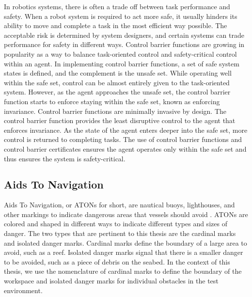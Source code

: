 In robotics systems, there is often a trade off between task performance and safety. When a robot system is required to act more safe, it usually hinders its ability to move and complete a task in the most efficient way possible. The acceptable risk is determined by system designers, and certain systems can trade performance for safety in different ways. Control barrier functions \cite{ames2019control} are growing in popularity as a way to balance task-oriented control and safety-critical control within an agent. In implementing control barrier functions, a set of safe system states is defined, and the complement is the unsafe set. While operating well within the safe set, control can be almost entirely given to the task-oriented system. However, as the agent approaches the unsafe set, the control barrier function starts to enforce staying within the safe set, known as enforcing invariance. Control barrier functions are minimally invasive by design. The control barrier function provides the least disruptive control to the agent that enforces invariance. As the state of the agent enters deeper into the safe set, more control is returned to completing tasks. The use of control barrier functions and control barrier certificates ensures the agent operates only within the safe set and thus ensures the system is safety-critical.

\subsection{Aids To Navigation}

Aids To Navigation, or ATONs for short, are nautical buoys, lighthouses, and other markings to indicate dangerous areas that vessels should avoid \cite{CoastGuard}. ATONs are colored and shaped in different ways to indicate different types and sizes of danger. The two types that are pertinent to this thesis are the cardinal marks and isolated danger marks. Cardinal marks define the boundary of a large area to avoid, such as a reef. Isolated danger marks signal that there is a smaller danger to be avoided, such as a piece of debris on the seabed. In the context of this thesis, we use the nomenclature of cardinal marks to define the boundary of the workspace and isolated danger marks for individual obstacles in the test environment.